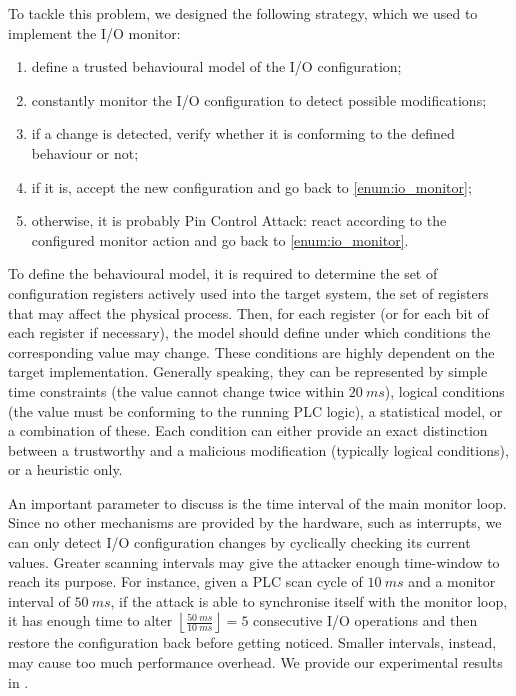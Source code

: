 To tackle this problem, we designed the following strategy, which we used to implement the I/O monitor:
\begin{enumerate}
	\item define a trusted behavioural model of the I/O configuration;
	\item \label{enum:io_monitor} constantly monitor the I/O configuration to detect possible modifications;
	\item if a change is detected, verify whether it is conforming to the defined behaviour or not;
	\item if it is, accept the new configuration and go back to \ref{enum:io_monitor};
	\item otherwise, it is probably Pin Control Attack: react according to the configured monitor action and go back to \ref{enum:io_monitor}.
\end{enumerate}
To define the behavioural model, it is required to determine the set of configuration registers actively used into the target system,
\ie the set of registers that may affect the physical process. Then, for each register (or for each bit of each register if necessary),
the model should define under which conditions the corresponding value may change. These conditions are highly dependent on the target implementation.
Generally speaking, they can be represented by simple time constraints (\eg the value cannot change twice within $\SI{20}{ms}$),
logical conditions (\eg the value must be conforming to the running PLC logic), a statistical model, or a combination of these.
Each condition can either provide an exact distinction between a trustworthy and a malicious modification (typically logical conditions),
or a heuristic only.

An important parameter to discuss is the time interval of the main monitor loop. Since no other mechanisms are provided by the hardware,
such as interrupts, we can only detect I/O configuration changes by cyclically checking its current values. Greater scanning intervals may give the attacker
enough time-window to reach its purpose. For instance, given a PLC scan cycle of $\SI{10}{ms}$ and a monitor interval of $\SI{50}{ms}$,
if the attack is able to synchronise itself with the monitor loop, it has enough time to alter $\left \lfloor{\frac{\SI{50}{ms}}{\SI{10}{ms}}}\right \rfloor = 5$ consecutive I/O operations
and then restore the configuration back before getting noticed. Smaller intervals, instead, may cause too much performance overhead.
We provide our experimental results in .

